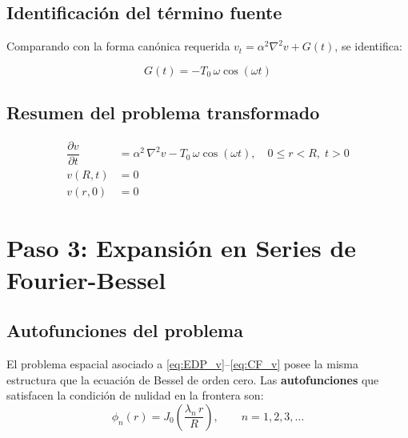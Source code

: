\documentclass[12pt, a4paper]{article}
\newenvironment{resultado}[1][]{%
  \begin{tcolorbox}[resultadoestilo, title={#1}]%
}{%
  \end{tcolorbox}%
}
\newcommand{\pd}[2]{\dfrac{\partial #1}{\partial #2}}
\begin{document}
\subsection{Identificación del término fuente}

Comparando con la forma canónica requerida $v_t = \alpha^2\nabla^2 v + G(t)$, se identifica:

\begin{resultado}[Término fuente]
\begin{equation}
  G(t) = -T_0\,\omega\cos(\omega t)
  \label{eq:Gt}
\end{equation}
\end{resultado}

\subsection{Resumen del problema transformado}

\begin{tcolorbox}[
  enhanced,
  colback=grisclaro,
  colframe=azulprimario,
  title={\textbf{Problema para $v(r,t)$}},
  fonttitle=\bfseries,
  arc=3mm, boxrule=0.8pt, breakable
]
\begin{align}
  \pd{v}{t} &= \alpha^2\,\nabla^2 v - T_0\,\omega\cos(\omega t),
  \quad 0 \leq r < R,\; t > 0 \label{eq:EDP_v}\\[4pt]
  v(R,t) &= 0 \label{eq:CF_v}\\[4pt]
  v(r,0) &= 0 \label{eq:CI_v}
\end{align}
\end{tcolorbox}


\section{Paso 3: Expansión en Series de Fourier-Bessel}

\subsection{Autofunciones del problema}

El problema espacial asociado a \eqref{eq:EDP_v}--\eqref{eq:CF_v} posee la misma estructura
que la ecuación de Bessel de orden cero. Las \textbf{autofunciones} que satisfacen la condición
de nulidad en la frontera son:
\begin{equation}
  \phi_n(r) = J_0\!\left(\frac{\lambda_n\, r}{R}\right), \qquad n = 1, 2, 3, \ldots
\end{equation}
\end{document}
